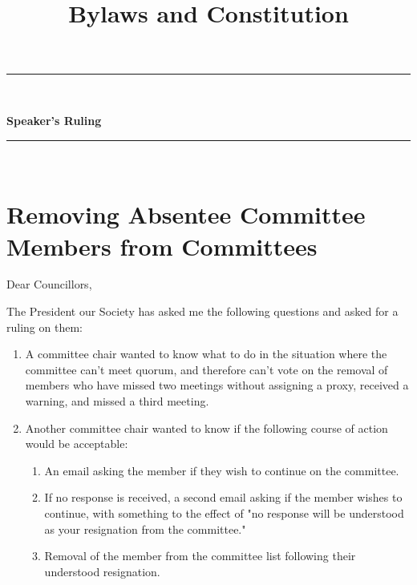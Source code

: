 \documentclass[12pt,letterpaper]{book}
\title{Bylaws and Constitution}
\begin{document}

\begin{center}
\rule{\textwidth}{3.6pt}\\[\baselineskip] %
\begin{Huge}
\textbf{Speaker's Ruling}
\end{Huge}

\rule{\textwidth}{3.6pt}\\[\baselineskip] %



\vspace*{2\baselineskip} %
\end{center}
\section*{Removing Absentee Committee Members from Committees}

Dear Councillors,

The President our Society has asked me the following questions and asked for a ruling on them: 
\begin{enumerate}

\item A committee chair wanted to know what to do in the situation where the committee can't meet quorum, and therefore can't vote on the removal of members who have missed two meetings without assigning a proxy, received a warning, and missed a third meeting. 

\item Another committee chair wanted to know if the following course of action would be acceptable:
\begin{enumerate}
\item An email asking the member if they wish to continue on the committee.
\item If no response is received, a second email asking if the member wishes to continue, with something to the effect of "no response will be understood as your resignation from the committee."
\item Removal of the member from the committee list following their understood resignation.
\end{enumerate}



\end{enumerate}	

\end{document}
